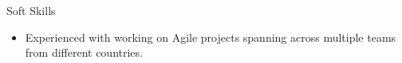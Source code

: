 \documentclass[]{style}
\begin{document}
	\begin{cvsection}{Soft Skills}
		\begin{cvsubsection}{}{}{}	
			\begin{itemize}
                \item Experienced with working on Agile projects spanning across multiple teams from different countries.
			\end{itemize}
		\end{cvsubsection}
	\end{cvsection}
	
	
\end{document}
